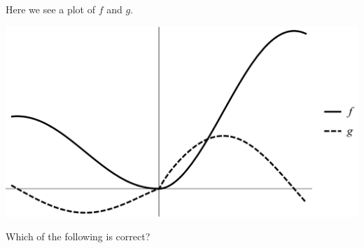 \documentclass{ximera}
\author{Bart Snapp}
\begin{document}
\begin{exercise}
Here we see a plot of $f$ and $g$. 
\begin{image}
\includegraphics[width=.5\textwidth]{graphFandG11.png}
\end{image}
Which of the following is correct?
\begin{multipleChoice}
\end{multipleChoice}
\end{exercise}
\end{document}
